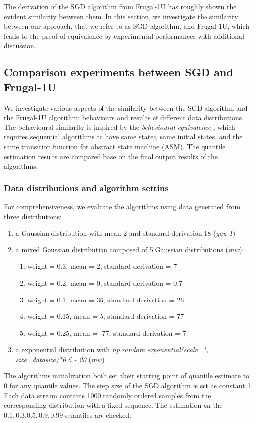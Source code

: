 The derivation of the SGD algorithm from Frugal-1U has roughly shown the evident similarity between them. In this section, we investigate the similarity between our approach, that we refer to as SGD algorithm, and Frugal-1U, which leads to the proof of equivalence by experimental performances with additional discussion.

\subsection{Comparison experiments between SGD and Frugal-1U}

We investigate various aspects of the similarity between the SGD algorithm and the Frugal-1U algorithm: behaviours and results of different data distributions. The behavioural similarity is inspired by the \textit{behavioural equivalence} \cite{gurevichSequentialAbstractstateMachines2000}, which requires sequential algorithms to have same states, same initial states, and the same transition function for abstract state machine (ASM). The quantile estimation results are compared base on the final output results of the algorithms.

\subsubsection{Data distributions and algorithm settins}
\label{subsubsec: distro_and_setting}
For comprehensiveness, we evaluate the algorithms using data generated from three distributions:
    \begin{enumerate}
        \item a Gaussian distribution with mean 2 and standard derivation 18 (\textit{gau-1})
        \item a mixed Gaussian distribution composed of 5 Gaussian distributions (\textit{mix}):
            \begin{enumerate}
                \item weight = 0.3, mean = 2, standard derivation = 7
                \item weight = 0.2, mean = 0, standard derivation = 0.7
                \item weight = 0.1, mean = 36, standard derivation = 26
                \item weight = 0.15, mean = 5, standard derivation = 77
                \item weight = 0.25, mean = -77, standard derivation = 7
            \end{enumerate}
            \item a exponential distribution with \textit{np.random.exponential(scale=1, size=datasize)*6.5 - 20} (\textit{mix})
    \end{enumerate}
The algorithms initialization both set their starting point of quantile estimate to $0$ for any quantile values. The step size of the SGD algorithm is set as constant 1. Each data stream contains 1000 randomly ordered samples from the corresponding distribution with a fixed sequence. The estimation on the $0.1, 0.3. 0.5, 0.9, 0.99$ quantiles are checked.

